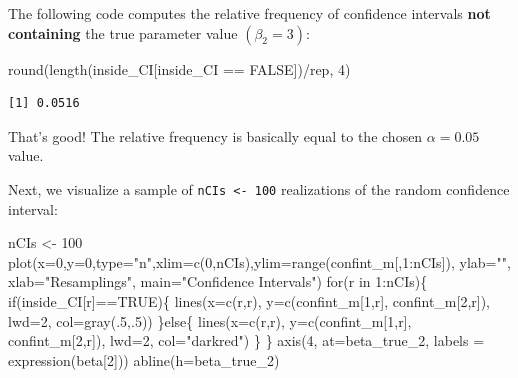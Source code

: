 \documentclass[
  letterpaper,
  DIV=11,
  numbers=noendperiod]{scrreprt}
\newenvironment{Shaded}{\begin{snugshade}}{\end{snugshade}}
\newcommand{\AttributeTok}[1]{\textcolor[rgb]{0.40,0.45,0.13}{#1}}
\newcommand{\ConstantTok}[1]{\textcolor[rgb]{0.56,0.35,0.01}{#1}}
\newcommand{\ControlFlowTok}[1]{\textcolor[rgb]{0.00,0.23,0.31}{#1}}
\newcommand{\DecValTok}[1]{\textcolor[rgb]{0.68,0.00,0.00}{#1}}
\newcommand{\FunctionTok}[1]{\textcolor[rgb]{0.28,0.35,0.67}{#1}}
\newcommand{\NormalTok}[1]{\textcolor[rgb]{0.00,0.23,0.31}{#1}}
\newcommand{\OtherTok}[1]{\textcolor[rgb]{0.00,0.23,0.31}{#1}}
\newcommand{\SpecialCharTok}[1]{\textcolor[rgb]{0.37,0.37,0.37}{#1}}
\newcommand{\StringTok}[1]{\textcolor[rgb]{0.13,0.47,0.30}{#1}}
\theoremstyle{definition}
\theoremstyle{plain}
\theoremstyle{plain}
\theoremstyle{remark}
\begin{document}
The following code computes the relative frequency of confidence
intervals \textbf{not containing} the true parameter value
\((\beta_2=3)\):

\begin{Shaded}
\begin{Highlighting}[]
\FunctionTok{round}\NormalTok{(}\FunctionTok{length}\NormalTok{(inside\_CI[inside\_CI }\SpecialCharTok{==} \ConstantTok{FALSE}\NormalTok{])}\SpecialCharTok{/}\NormalTok{rep, }\DecValTok{4}\NormalTok{)}
\end{Highlighting}
\end{Shaded}

\begin{verbatim}
[1] 0.0516
\end{verbatim}

That's good! The relative frequency is basically equal to the chosen
\(\alpha=0.05\) value.

Next, we visualize a sample of \texttt{nCIs\ \textless{}-\ 100}
realizations of the random confidence interval:

\begin{Shaded}
\begin{Highlighting}[]
\NormalTok{nCIs }\OtherTok{\textless{}{-}} \DecValTok{100}
\FunctionTok{plot}\NormalTok{(}\AttributeTok{x=}\DecValTok{0}\NormalTok{,}\AttributeTok{y=}\DecValTok{0}\NormalTok{,}\AttributeTok{type=}\StringTok{"n"}\NormalTok{,}\AttributeTok{xlim=}\FunctionTok{c}\NormalTok{(}\DecValTok{0}\NormalTok{,nCIs),}\AttributeTok{ylim=}\FunctionTok{range}\NormalTok{(confint\_m[,}\DecValTok{1}\SpecialCharTok{:}\NormalTok{nCIs]),}
     \AttributeTok{ylab=}\StringTok{""}\NormalTok{, }\AttributeTok{xlab=}\StringTok{"Resamplings"}\NormalTok{, }\AttributeTok{main=}\StringTok{"Confidence Intervals"}\NormalTok{)}
\ControlFlowTok{for}\NormalTok{(r }\ControlFlowTok{in} \DecValTok{1}\SpecialCharTok{:}\NormalTok{nCIs)\{}
  \ControlFlowTok{if}\NormalTok{(inside\_CI[r]}\SpecialCharTok{==}\ConstantTok{TRUE}\NormalTok{)\{}
      \FunctionTok{lines}\NormalTok{(}\AttributeTok{x=}\FunctionTok{c}\NormalTok{(r,r), }\AttributeTok{y=}\FunctionTok{c}\NormalTok{(confint\_m[}\DecValTok{1}\NormalTok{,r], confint\_m[}\DecValTok{2}\NormalTok{,r]), }
            \AttributeTok{lwd=}\DecValTok{2}\NormalTok{, }\AttributeTok{col=}\FunctionTok{gray}\NormalTok{(.}\DecValTok{5}\NormalTok{,.}\DecValTok{5}\NormalTok{))}
\NormalTok{  \}}\ControlFlowTok{else}\NormalTok{\{}
      \FunctionTok{lines}\NormalTok{(}\AttributeTok{x=}\FunctionTok{c}\NormalTok{(r,r), }\AttributeTok{y=}\FunctionTok{c}\NormalTok{(confint\_m[}\DecValTok{1}\NormalTok{,r], confint\_m[}\DecValTok{2}\NormalTok{,r]), }
            \AttributeTok{lwd=}\DecValTok{2}\NormalTok{, }\AttributeTok{col=}\StringTok{"darkred"}\NormalTok{)}
\NormalTok{    \}}
\NormalTok{\}}
\FunctionTok{axis}\NormalTok{(}\DecValTok{4}\NormalTok{, }\AttributeTok{at=}\NormalTok{beta\_true\_2, }\AttributeTok{labels =} \FunctionTok{expression}\NormalTok{(beta[}\DecValTok{2}\NormalTok{]))}
\FunctionTok{abline}\NormalTok{(}\AttributeTok{h=}\NormalTok{beta\_true\_2)}
\end{Highlighting}
\end{Shaded}
\end{document}
